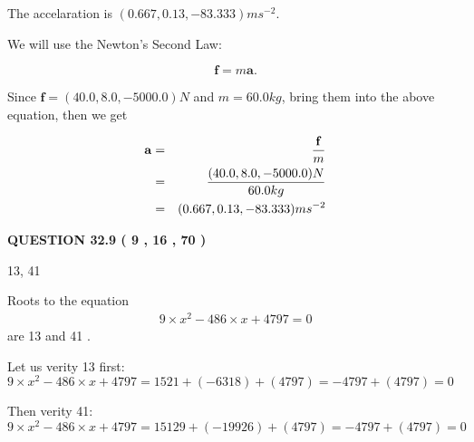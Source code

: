 \documentclass[12pt]{article}
\begin{document}
  
 
 
\noindent{}
 
 
  The accelaration is $  %
(
0.667,
0.13,
-83.333)
ms^{-2} $.
 
 
 
 
 
 
\noindent{}

We will use the Newton's Second Law:
 
\[
\mathbf{f}=m\mathbf{a}.
\]
 
Since $\mathbf{f}= %
(40.0 , 8.0 , -5000.0) N$
and $m= %
60.0kg$, bring them into the above equation, then we get
 
\begin{eqnarray*}
\mathbf{a}&=&\frac{\mathbf{f}}m  \\
&=&\frac{ %
(40.0 , 8.0 , -5000.0) N}{ %
60.0kg}  \\
&=& %
(0.667 , 0.13 , -83.333) ms^{-2}
\end{eqnarray*}
 
 
 
  
\vspace{0.2in}
  
{\textbf{\Large{QUESTION
32.9 
 (           9 ,          16 ,          70 )
}}}
  
  


 
 
\noindent{}

13,  %
41
 
 
 
 
 
\noindent{}

Roots to the equation
\begin{eqnarray*}
9 \times x^2  %
-486
                 \times x    %
+  %
4797 =0
\end{eqnarray*}
are  %
13 and  %
41 .
 
Let us verity  %
13 first:
$  %
9 \times x^2  %
-486
                 \times x    %
+  %
4797
  = %
1521+( %
-6318)+( %
4797)
  = %
-4797+( %
4797)
  = %
0
$
 
Then verity  %
41:
$  %
9 \times x^2  %
-486
                 \times x    %
+  %
4797
  = %
15129+( %
-19926)+( %
4797)
  = %
-4797+( %
4797)
  = %
0
$
 
\end{document}
